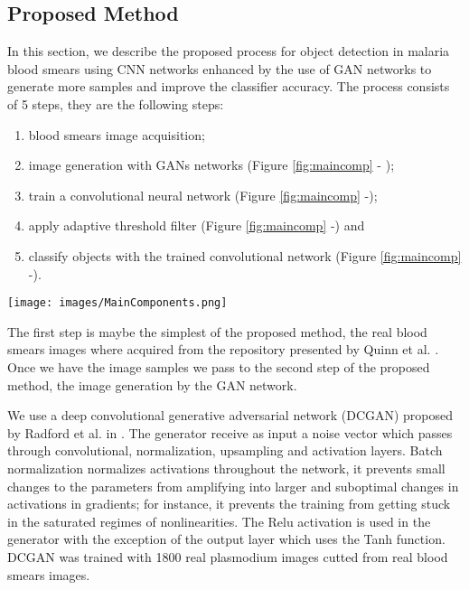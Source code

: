 \subsection{Proposed Method}
\label{segmethod}

In this section, we describe the proposed process for object detection in malaria blood smears using CNN networks enhanced by the use of GAN networks to generate more samples and improve the classifier accuracy. The process consists of 5 steps, they are the following steps: 
\begin{enumerate}
\item blood smears image acquisition; 
\item image generation with GANs networks (Figure \ref{fig:maincomp} - ); 
\item train a convolutional neural network (Figure \ref{fig:maincomp} -); 
\item apply adaptive threshold filter (Figure \ref{fig:maincomp} -) and 
\item classify objects with the trained convolutional network (Figure \ref{fig:maincomp} -). 
\end{enumerate}

\begin{figure*}[h]
\caption{Process for object detection in malaria blood smears using DCGAN networks}
\label{fig:maincomp}
  \texttt{[image: images/MainComponents.png]}
\end{figure*}

The first step is maybe the simplest of the proposed method, the real blood smears images where acquired from the repository presented by Quinn et al. \cite{Quinn2016DeepDiagnostics}. Once we have the image samples we pass to the second step of the proposed method, the image generation by the GAN network. 

We use a deep convolutional generative adversarial network (DCGAN) proposed by Radford et al. in \cite{Radford2015}. The generator receive as input a noise vector which passes through convolutional, normalization, upsampling and activation layers. Batch normalization normalizes activations throughout the network, it prevents small changes to the parameters from amplifying into larger and suboptimal changes in activations in gradients; for instance, it prevents the training from getting stuck in the saturated regimes of nonlinearities. The Relu activation is used in the generator with the exception of the output layer which uses the Tanh function. DCGAN  was trained with 1800 real plasmodium images cutted from real blood smears images.

